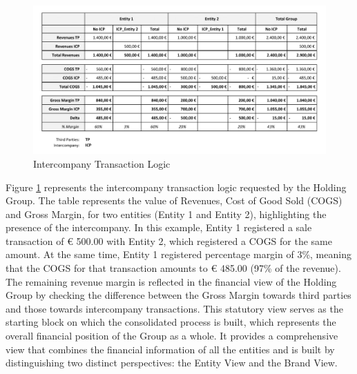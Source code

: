 \documentclass[12pt,a4paper,openright,twoside]{book}
\begin{document}
\begin{figure}[htbp]
	\centering
	\includegraphics[width=\linewidth]{figures/intercompany.pdf}
	\caption{Intercompany Transaction Logic}
	\label{fig:icp}
\end{figure}

Figure \ref{fig:icp} represents the intercompany transaction logic requested by the Holding Group.
%
The table represents the value of Revenues, Cost of Good Sold (COGS) and Gross Margin, for two entities (Entity 1 and Entity 2), highlighting the presence of the intercompany.
%
In this example, Entity 1 registered a sale transaction of € 500.00 with Entity 2, which registered a COGS for the same amount. 
%
At the same time, Entity 1 registered percentage margin of 3\%, meaning that the COGS for that transaction amounts to € 485.00 (97\% of the revenue).
%
The remaining revenue margin is reflected in the financial view of the Holding Group by checking the difference between the Gross Margin towards third parties and those towards intercompany transactions.
%
This statutory view serves as the starting block on which the consolidated process is built, which represents the overall financial position of the Group as a whole.
%
It provides a comprehensive view that combines the financial information of all the entities and is built by distinguishing two distinct perspectives: the Entity View and the Brand View.
\end{document}
